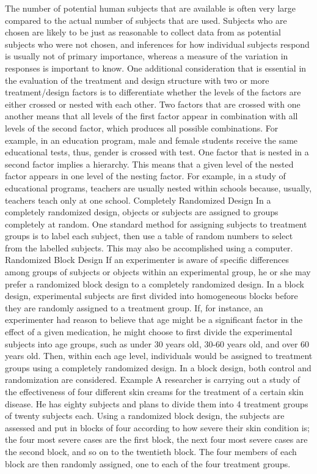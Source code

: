 The number of potential human subjects that are available is often very large compared to the actual number of subjects that are used.  Subjects who are chosen are likely to be just as reasonable to collect data from as potential subjects who were not chosen, and inferences for how individual subjects respond is usually not of primary importance, whereas a measure of the variation in responses is important to know. 
One additional consideration that is essential in the evaluation of the treatment and design structure with two or more treatment/design factors is to differentiate whether the levels of the factors are either crossed or nested with each other. Two factors that are crossed with one another means that all levels of the first factor appear in combination with all levels of the second factor, which produces all possible combinations.  For example, in an education program, male and female students receive the same educational tests, thus, gender is crossed with test. 
One factor that is nested in a second factor implies a hierarchy.  This means that a given level of the nested factor appears in one level of the nesting factor.  For example, in a study of educational programs, teachers are usually nested within schools because, usually, teachers teach only at one school.
Completely Randomized Design
In a completely randomized design, objects or subjects are assigned to groups completely at random. One standard method for assigning subjects to treatment groups is to label each subject, then use a table of random numbers to select from the labelled subjects. This may also be accomplished using a computer. 
Randomized Block Design
If an experimenter is aware of specific differences among groups of subjects or objects within an experimental group, he or she may prefer a randomized block design to a completely randomized design. In a block design, experimental subjects are first divided into homogeneous blocks before they are randomly assigned to a treatment group. If, for instance, an experimenter had reason to believe that age might be a significant factor in the effect of a given medication, he might choose to first divide the experimental subjects into age groups, such as under 30 years old, 30-60 years old, and over 60 years old. 
Then, within each age level, individuals would be assigned to treatment groups using a completely randomized design. 
In a block design, both control and randomization are considered.
Example
A researcher is carrying out a study of the effectiveness of four different skin creams for the treatment of a certain skin disease. He has eighty subjects and plans to divide them into 4 treatment groups of twenty subjects each. 
Using a randomized block design, the subjects are assessed and put in blocks of four according to how severe their skin condition is; the four most severe cases are the first block, the next four most severe cases are the second block, and so on to the twentieth block. The four members of each block are then randomly assigned, one to each of the four treatment groups. 


